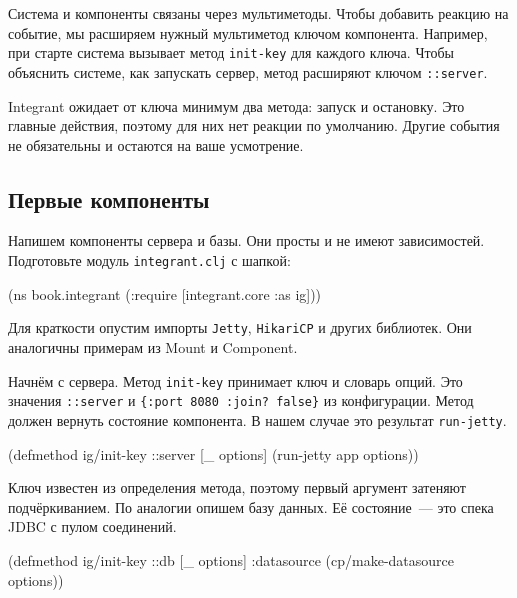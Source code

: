 
Система и компоненты связаны через мультиметоды. Чтобы добавить реакцию на
событие, мы расширяем нужный мультиметод ключом компонента. Например, при старте
система вызывает метод \verb|init-key| для каждого ключа. Чтобы объяснить
системе, как запускать сервер, метод расширяют ключом \verb|::server|.

Integrant ожидает от ключа минимум два метода: запуск и остановку. Это главные
действия, поэтому для них нет реакции по умолчанию. Другие события не
обязательны и остаются на ваше усмотрение.

\subsection{Первые компоненты}


Напишем компоненты сервера и базы. Они просты и не имеют
зависимостей. Подготовьте модуль \verb|integrant.clj| с шапкой:

\begin{english}
  \begin{clojure}
(ns book.integrant
  (:require [integrant.core :as ig]))
  \end{clojure}
\end{english}

Для краткости опустим импорты \verb|Jetty|, \verb|HikariCP| и других
библиотек. Они аналогичны примерам из Mount и Component.

Начнём с сервера. Метод \verb|init-key| принимает ключ и словарь опций. Это
значения \verb|::server| и \verb|{:port 8080 :join? false}| из
конфигурации. Метод должен вернуть состояние компонента. В нашем случае это
результат \verb|run-jetty|.

\begin{english}
  \begin{clojure}
(defmethod ig/init-key ::server
  [_ options]
  (run-jetty app options))
  \end{clojure}
\end{english}


Ключ известен из определения метода, поэтому первый аргумент затеняют
подчёркиванием. По аналогии опишем базу данных. Её состояние~--- это спека JDBC с
пулом соединений.

\begin{english}
  \begin{clojure}
(defmethod ig/init-key ::db
  [_ options]
  {:datasource (cp/make-datasource options)})
  \end{clojure}
\end{english}

